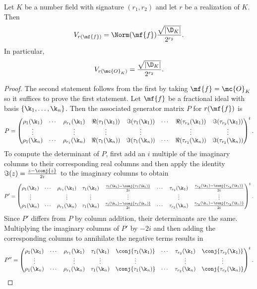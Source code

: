     \begin{proposition}\label{prop:covolume_of_fractional_ideal_under_realization}
      Let $K$ be a number field with signature $(r_{1},r_{2})$ and let $r$ be a realization of $K$. Then
      \[
        V_{r(\mf{f})} = \Norm(\mf{f})\frac{\sqrt{|\D_{K}|}}{2^{r_{2}}}.
      \]
      In particular,
      \[
        V_{r(\mc{O}_{K})} = \frac{\sqrt{|\D_{K}|}}{2^{r_{2}}}.
      \]
    \end{proposition}
    \begin{proof}
      The second statement follows from the first by taking $\mf{f} = \mc{O}_{K}$ so it suffices to prove the first statement. Let $\mf{f}$ be a fractional ideal with basis $\{\k_{1},\ldots,\k_{n}\}$. Then the associated generator matrix $P$ for $r(\mf{f})$ is
      \[
        P = \begin{pmatrix} \rho_{1}(\k_{1}) & \cdots & \rho_{r_{1}}(\k_{1}) & \Re(\tau_{1}(\k_{1})) & \Im(\tau_{1}(\k_{1})) & \cdots & \Re(\tau_{r_{2}}(\k_{1})) & \Im(\tau_{r_{2}}(\k_{1})) \\ \vdots & & \vdots & \vdots & \vdots & & \vdots & \vdots \\ \rho_{1}(\k_{n}) & \cdots & \rho_{r_{1}}(\k_{n}) & \Re(\tau_{1}(\k_{n})) & \Im(\tau_{1}(\k_{n})) & \cdots & \Re(\tau_{r_{2}}(\k_{n})) & \Im(\tau_{r_{2}}(\k_{n})) \end{pmatrix}^{t}.
      \]
      To compute the determinant of $P$, first add an $i$ multiple of the imaginary columns to their corresponding real columns and then apply the identity $\Im(z) = \frac{z-\conj{z}}{2i}$ to the imaginary columns to obtain
      \[
        P' = \begin{pmatrix} \rho_{1}(\k_{1}) & \cdots & \rho_{r_{1}}(\k_{1}) & \tau_{1}(\k_{1}) & \frac{\tau_{1}(\k_{1})-\conj{\tau_{1}(\k_{1})}}{2i} & \cdots & \tau_{r_{2}}(\k_{1}) & \frac{\tau_{r_{2}}(\k_{1})-\conj{\tau_{r_{2}}(\k_{1})}}{2i} \\ \vdots & & \vdots & \vdots & \vdots & & \vdots & \vdots \\ \rho_{1}(\k_{n}) & \cdots & \rho_{r_{1}}(\k_{n}) & \tau_{1}(\k_{n}) & \frac{\tau_{1}(\k_{n})-\conj{\tau_{1}(\k_{n})}}{2i} & \cdots & \tau_{r_{2}}(\k_{n}) & \frac{\tau_{r_{2}}(\k_{n})-\conj{\tau_{r_{2}}(\k_{n})}}{2i} \end{pmatrix}^{t}.
      \]
      Since $P'$ differs from $P$ by column addition, their determinants are the same. Multiplying the imaginary columns of $P'$ by $-2i$ and then adding the corresponding columns to annihilate the negative terms results in
      \[
        P'' = \begin{pmatrix} \rho_{1}(\k_{1}) & \cdots & \rho_{r_{1}}(\k_{1}) & \tau_{1}(\k_{1}) &\conj{\tau_{1}(\k_{1})} & \cdots & \tau_{r_{2}}(\k_{1}) & \conj{\tau_{r_{2}}(\k_{1})} \\ \vdots & & \vdots & \vdots & \vdots & & \vdots & \vdots \\ \rho_{1}(\k_{n}) & \cdots & \rho_{r_{1}}(\k_{n}) & \tau_{1}(\k_{n}) & \conj{\tau_{1}(\k_{n})} & \cdots & \tau_{r_{2}}(\k_{n}) & \conj{\tau_{r_{2}}(\k_{n})} \end{pmatrix}^{t}.
\]
\end{proof}

